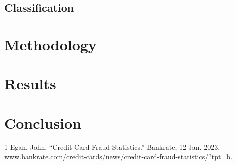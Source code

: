 \documentclass[12pt, letterpaper]{article}
\begin{document}
    \subsection{Classification}
        
    

\section{Methodology}

\section{Results}

\section{Conclusion}

\begin{thebibliography} {1}
    Egan, John. “Credit Card Fraud Statistics.” Bankrate, 12 Jan. 2023, www.bankrate.com/credit-cards/news/credit-card-fraud-statistics/?tpt=b.

    
\end{thebibliography}
    
\end{document}
